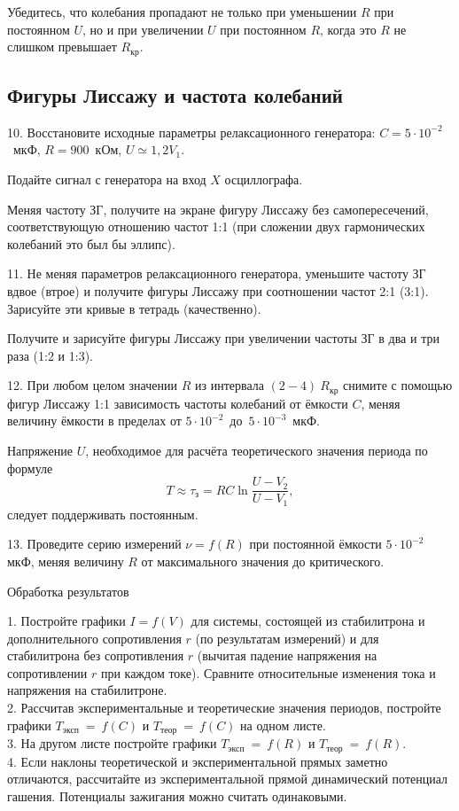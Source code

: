 Убедитесь, что колебания пропадают не только при уменьшении $R$ при постоянном $U$, но и при увеличении $U$ при постоянном $R$, когда это $R$ не слишком превышает $R_{\text{кр}}$.

\subsection{\label{sec:level2}Фигуры Лиссажу и частота колебаний}

10. Восстановите исходные параметры релаксационного генератора: $C = 5 \cdot 10^{-2}$~мкФ, $R = 900$~кОм, $U \simeq 1,2V_1$.

Подайте сигнал с генератора на вход $X$ осциллографа.

Меняя частоту ЗГ, получите на экране фигуру Лиссажу без самопересечений, соответствующую отношению частот 1:1 (при сложении двух гармонических колебаний это был бы эллипс).

11. Не меняя параметров релаксационного генератора, уменьшите частоту ЗГ вдвое (втрое) и получите фигуры Лиссажу при соотношении частот 2:1 (3:1). Зарисуйте эти кривые в тетрадь (качественно).

Получите и зарисуйте фигуры Лиссажу при увеличении частоты ЗГ в два и три раза (1:2 и 1:3).

12. При любом целом значении $R$ из интервала $(2-4)~R_{\text{кр}}$ снимите с помощью фигур Лиссажу 1:1 зависимость частоты колебаний от ёмкости $C$, меняя величину ёмкости в пределах от $5 \cdot 10^{-2}$~до~$5 \cdot 10^{-3}$~мкФ.

Напряжение $U$, необходимое для расчёта теоретического значения периода по формуле
$$ T \approx \tau_{\text{з}} = RC \ln {\frac{U - V_2}{U - V_1}},$$
следует поддерживать постоянным.

13. Проведите серию измерений $\nu = f(R)$ при постоянной ёмкости $5 \cdot 10^{-2}$ мкФ, меняя величину $R$ от максимального значения до критического.

\begin{center}
Обработка результатов
\end{center}
1. Постройте графики $I = f(V)$ для системы, состоящей из стабилитрона и дополнительного сопротивления $r$ (по результатам измерений) и для стабилитрона без сопротивления $r$ (вычитая падение напряжения на сопротивлении $r$ при каждом токе). Сравните относительные изменения тока и напряжения на стабилитроне.\\
2. Рассчитав экспериментальные и теоретические значения периодов, постройте графики $T_{\text{эксп}}~=~f(C)$ и $T_{\text{теор}}~=~f(C)$ на одном листе.\\
3. На другом листе постройте графики $T_{\text{эксп}}~=~f(R)$ и $T_{\text{теор}}~=~f(R)$.\\
4. Если наклоны теоретической и экспериментальной прямых заметно отличаются, рассчитайте из экспериментальной прямой динамический потенциал гашения. Потенциалы зажигания можно считать одинаковыми.

